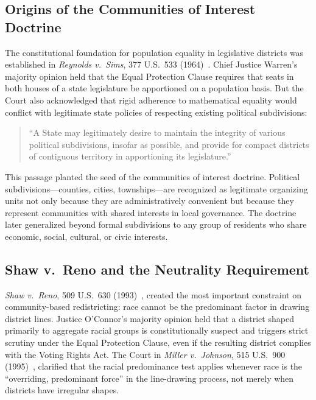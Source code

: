 \label{sec:legal}

\subsection{Origins of the Communities of Interest Doctrine}

The constitutional foundation for population equality in legislative districts was
established in \textit{Reynolds v.\ Sims}, 377 U.S.\ 533 (1964)~\citep{reynolds1964}.
Chief Justice Warren's majority opinion held that the Equal Protection Clause requires
that seats in both houses of a state legislature be apportioned on a population basis.
But the Court also acknowledged that rigid adherence to mathematical equality would
conflict with legitimate state policies of respecting existing political subdivisions:
\begin{quote}
  ``A State may legitimately desire to maintain the integrity of various political
  subdivisions, insofar as possible, and provide for compact districts of contiguous
  territory in apportioning its legislature.''
\end{quote}
This passage planted the seed of the communities of interest doctrine.
Political subdivisions---counties, cities, townships---are recognized as legitimate
organizing units not only because they are administratively convenient but because
they represent communities with shared interests in local governance.
The doctrine later generalized beyond formal subdivisions to any group of residents
who share economic, social, cultural, or civic interests.

\subsection{Shaw v.\ Reno and the Neutrality Requirement}

\textit{Shaw v.\ Reno}, 509 U.S.\ 630 (1993)~\citep{shaw1993}, created the most
important constraint on community-based redistricting: race cannot be the predominant
factor in drawing district lines.
Justice O'Connor's majority opinion held that a district shaped primarily to aggregate
racial groups is constitutionally suspect and triggers strict scrutiny under the
Equal Protection Clause, even if the resulting district complies with the Voting Rights
Act.
The Court in \textit{Miller v.\ Johnson}, 515 U.S.\ 900 (1995)~\citep{miller1995},
clarified that the racial predominance test applies whenever race is the ``overriding,
predominant force'' in the line-drawing process, not merely when districts have
irregular shapes.

